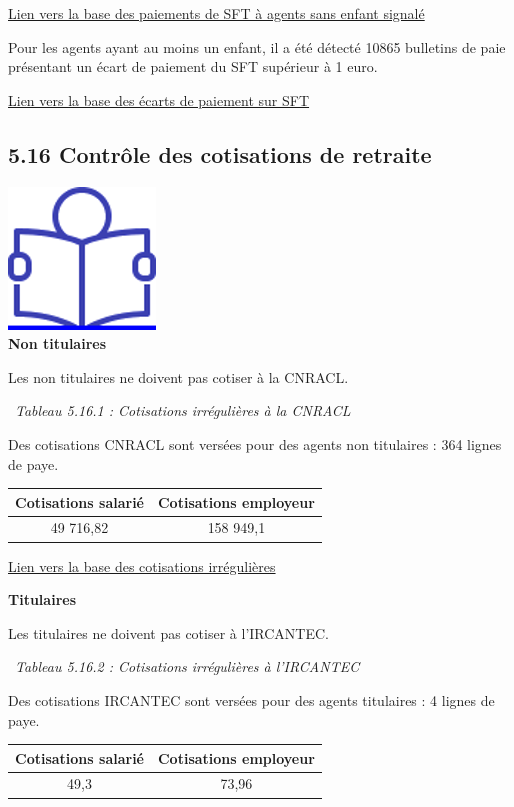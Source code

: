\href{../Bases/Reglementation/Paie.sans.enfant.reduit.csv}{Lien vers la
base des paiements de SFT à agents sans enfant signalé}

Pour les agents ayant au moins un enfant, il a été détecté 10865
bulletins de paie présentant un écart de paiement du SFT supérieur à 1
euro.

\href{../Bases/Reglementation/controle.sft.csv}{Lien vers la base des
écarts de paiement sur SFT}

\hypertarget{controle-des-cotisations-de-retraite}{%
\subsection{5.16 Contrôle des cotisations de
retraite}\label{controle-des-cotisations-de-retraite}}

\href{../Docs/Notices/fiche_retraite.odt}{\includegraphics{icones/Notice.png}}\\
\textbf{Non titulaires}

Les non titulaires ne doivent pas cotiser à la CNRACL.

~\emph{Tableau 5.16.1 : Cotisations irrégulières à la CNRACL}

Des cotisations CNRACL sont versées pour des agents non titulaires : 364
lignes de paye.

\begin{longtable}[]{@{}cc@{}}
\toprule
Cotisations salarié & Cotisations employeur\tabularnewline
\midrule
\endhead
49 716,82 & 158 949,1\tabularnewline
\bottomrule
\end{longtable}

\href{../Bases/Reglementation/Cotisations.irreg.csv}{Lien vers la base des
cotisations irrégulières}

\textbf{Titulaires}

Les titulaires ne doivent pas cotiser à l'IRCANTEC.

~\emph{Tableau 5.16.2 : Cotisations irrégulières à l'IRCANTEC}

Des cotisations IRCANTEC sont versées pour des agents titulaires : 4
lignes de paye.

\begin{longtable}[]{@{}cc@{}}
\toprule
Cotisations salarié & Cotisations employeur\tabularnewline
\midrule
\endhead
49,3 & 73,96\tabularnewline
\bottomrule
\end{longtable}

